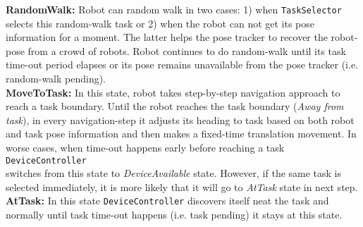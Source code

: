 \textbf{RandomWalk: }
Robot can random walk in two cases: 1) when \texttt{TaskSelector} selects this random-walk task or 2) when the robot can not get its pose information for a moment. The latter helps the pose tracker to recover the robot-pose from a crowd of robots. Robot continues to do random-walk until its task time-out period elapses or its pose remains unavailable from the pose tracker (i.e. random-walk pending).\\
\textbf{MoveToTask: }
In this state, robot takes step-by-step navigation approach to reach a task boundary. Until the robot reaches the task boundary ({\em Away from task}), in every navigation-step it adjusts its heading to task based on both  robot and task pose information and then makes a fixed-time translation movement. In worse cases, when time-out happens early before reaching a task  \texttt{DeviceController}\\ switches from this state to\textit{ DeviceAvailable} state. However, if the same task is selected immediately, it is more likely that it will go to \textit{AtTask} state in next step.
\textbf{AtTask: }
In this state  \texttt{DeviceController} discovers itself neat the task and normally until task time-out happens (i.e. task pending) it stays at this state.

